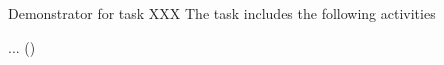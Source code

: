 \begin{task}[title=Teaching with Jupyter technology,
  id=task-id,
  lead=XXX,
  PM=1,
  wphases={0-48},
  partners={X,PSud}
  ]

  Demonstrator for task XXX
  The task includes the following activities
  \begin{compactitem}
  \item ...
    ()
  \end{compactitem}
\end{task}
